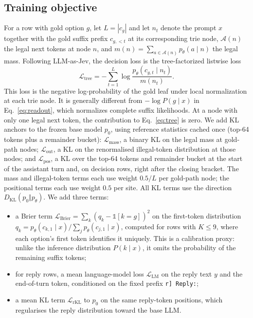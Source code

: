 \documentclass[11pt]{article}
\begin{document}
\subsection{Training objective}
For a row with gold option $g$, let $L=|c_g|$ and let $n_t$ denote the prompt $x$ together with the gold suffix prefix $c_{g,<t}$ at its corresponding trie node, $\mathcal{A}(n)$ the legal next tokens at node $n$, and $m(n)=\sum_{a\in\mathcal{A}(n)}p_\theta(a\mid n)$ the legal mass. Following LLM-as-Jev, the decision loss is the tree-factorized listwise loss
\begin{equation}
\mathcal{L}_{\text{tree}}=-\sum_{t=1}^{L}\log\frac{p_\theta(c_{g,t}\mid n_t)}{m(n_t)}.\label{eq:tree}
\end{equation}
This loss is the negative log-probability of the gold leaf under local normalization at each trie node. It is generally different from $-\log P(g\mid x)$ in Eq.~\eqref{eq:readout}, which normalizes complete suffix likelihoods. At a node with only one legal next token, the contribution to Eq.~\eqref{eq:tree} is zero. We add KL anchors to the frozen base model $p_0$, using reference statistics cached once (top-64 tokens plus a remainder bucket): $\mathcal{L}_{\text{mass}}$, a binary KL on the legal mass at gold-path nodes; $\mathcal{L}_{\text{out}}$, a KL on the renormalised illegal-token distribution at those nodes; and $\mathcal{L}_{\text{pos}}$, a KL over the top-64 tokens and remainder bucket at the start of the assistant turn and, on decision rows, right after the closing bracket. The mass and illegal-token terms each use weight $0.5/L$ per gold-path node; the positional terms each use weight $0.5$ per site. All KL terms use the direction $D_{\mathrm{KL}}(p_0\Vert p_\theta)$. We add three terms:
\begin{itemize}
\item a Brier term $\mathcal{L}_{\text{Brier}}=\sum_k\left(q_k-\mathbb{1}[k=g]\right)^2$ on the first-token distribution $q_k=p_\theta(c_{k,1}\mid x)/\sum_j p_\theta(c_{j,1}\mid x)$, computed for rows with $K\le9$, where each option's first token identifies it uniquely. This is a calibration proxy: unlike the inference distribution $P(k\mid x)$, it omits the probability of the remaining suffix tokens;
\item for reply rows, a mean language-model loss $\mathcal{L}_{\text{LM}}$ on the reply text $y$ and the end-of-turn token, conditioned on the fixed prefix \texttt{r] Reply:};
\item a mean KL term $\mathcal{L}_{\text{rKL}}$ to $p_0$ on the same reply-token positions, which regularises the reply distribution toward the base LLM.
\end{itemize}
\end{document}
